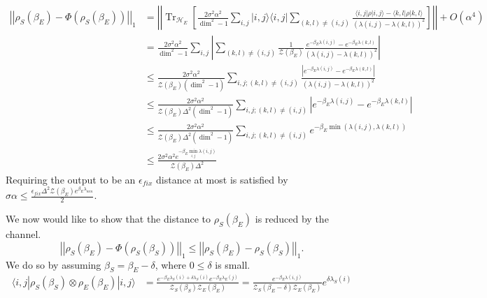 \documentclass{article}
\newcommand{\ket}[1]{|#1\rangle}
\newcommand{\bra}[1]{\langle #1|}
\newcommand{\ketbra}[2]{| #1\rangle\! \langle #2|}
\newcommand{\brackets}[1]{\left[ #1 \right]}
\newcommand{\abs}[1]{\left| #1 \right|}
\newcommand{\norm}[1]{\left| \left| #1 \right| \right|}
\newcommand{\bigo}[1]{O\left( #1 \right)}
\DeclareMathOperator{\Tr}{Tr}
\newcommand{\partrace}[2]{\Tr_{#1} \brackets{ #2 }}
\newcommand{\hilb}{\mathcal{H}}
\newcommand{\partfun}{\mathcal{Z}}
\begin{document}
\begin{align}
    \norm{\rho_S(\beta_E) - \Phi(\rho_S(\beta_E))}_1 &= \norm{\partrace{\hilb_E}{\frac{2 \sigma^2 \alpha^2}{\dim^2 - 1}\sum_{i,j} \ketbra{i,j}{i,j} \sum_{(k,l) \neq (i,j)}\frac{\bra{i,j} \rho \ket{i,j} - \bra{k,l} \rho \ket{k,l}}{(\lambda(i,j) - \lambda(k,l))^2} }} + \bigo{\alpha^4} \\
    &= \frac{2 \sigma^2 \alpha^2}{\dim^2 - 1} \sum_{i,j} \abs{\sum_{(k,l) \neq (i,j)} \frac{1}{\partfun(\beta_E)} \frac{e^{-\beta_E \lambda(i,j)} - e^{-\beta_E \lambda(k,l)}}{(\lambda(i,j) - \lambda(k,l))^2}} \\ 
    &\leq \frac{2 \sigma^2 \alpha^2}{\partfun(\beta_E) (\dim^2 - 1)} \sum_{i,j; (k,l) \neq (i,j)} \frac{\abs{e^{-\beta_E \lambda(i,j)} - e^{-\beta_E \lambda(k,l)}}}{(\lambda(i,j) - \lambda(k,l))^2} \\
    &\leq \frac{2 \sigma^2 \alpha^2}{\partfun(\beta_E) \Delta^2 (\dim^2 - 1)} \sum_{i,j; (k,l) \neq (i,j)} \abs{e^{-\beta_E \lambda(i,j)} - e^{-\beta_E \lambda(k,l)}} \\
    &\leq \frac{2 \sigma^2 \alpha^2}{\partfun(\beta_E) \Delta^2 (\dim^2 - 1)}  \sum_{i,j; (k,l) \neq (i,j)} e^{-\beta_E \min(\lambda(i,j), \lambda(k,l))} \\
    &\leq \frac{2 \sigma^2 \alpha^2 e^{-\beta_E \min_{i,j} \lambda(i,j)}}{\partfun(\beta_E) \Delta^2}
\end{align}
Requiring the output to be an $\epsilon_{fix}$ distance at most is satisfied by $\sigma \alpha \leq \frac{\epsilon_{fix} \Delta^2 \partfun(\beta_E) e^{\beta_E \lambda_{min}}}{2}$.

We now would like to show that the distance to $\rho_S(\beta_E)$ is reduced by the channel. $$\norm{\rho_S(\beta_E) - \Phi(\rho_S(\beta_S))}_1 \leq \norm{\rho_S(\beta_E) - \rho_S(\beta_S)}_1.$$ We do so by assuming $\beta_S = \beta_E - \delta$, where $0 \leq \delta$ is small.  
\begin{align}
    \bra{i,j} \rho_S(\beta_S) \otimes \rho_E(\beta_E) \ket{i,j} &= \frac{e^{-\beta_E \lambda_S (i) + \delta \lambda_S(i)} e^{-\beta_E \lambda_E(j)}}{\partfun_S(\beta_S) \partfun_E(\beta_E)} = \frac{e^{-\beta_E \lambda(i,j)}}{\partfun_S(\beta_E - \delta) \partfun_E(\beta_E) } e^{\delta \lambda_S(i)}
\end{align}
\end{document}
